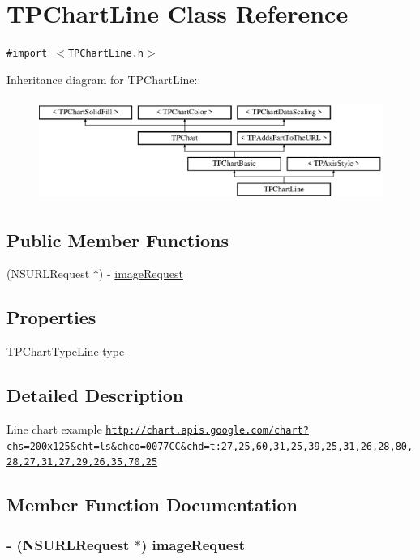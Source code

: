 \hypertarget{interface_t_p_chart_line}{
\section{TPChartLine Class Reference}
\label{interface_t_p_chart_line}
}
{\tt \#import $<$TPChartLine.h$>$}

Inheritance diagram for TPChartLine::\begin{figure}[H]
\begin{center}
\leavevmode
\includegraphics[height=3.31361cm]{interface_t_p_chart_line}
\end{center}
\end{figure}
\subsection*{Public Member Functions}
\begin{CompactItemize}
\item 
(NSURLRequest $\ast$) - \hyperlink{interface_t_p_chart_line_2fa4ce27ed67bce0c2d0d2a9b41c026c}{imageRequest}
\end{CompactItemize}
\subsection*{Properties}
\begin{CompactItemize}
\item 
TPChartTypeLine \hyperlink{interface_t_p_chart_line_04e85b606d425d8329ea5f9b0ec0f50f}{type}
\end{CompactItemize}


\subsection{Detailed Description}
Line chart example \href{http://chart.apis.google.com/chart?chs=200x125&cht=ls&chco=0077CC&chd=t:27,25,60,31,25,39,25,31,26,28,80,28,27,31,27,29,26,35,70,25}{\tt http://chart.apis.google.com/chart?chs=200x125\&cht=ls\&chco=0077CC\&chd=t:27,25,60,31,25,39,25,31,26,28,80,28,27,31,27,29,26,35,70,25} 

\subsection{Member Function Documentation}
\hypertarget{interface_t_p_chart_line_2fa4ce27ed67bce0c2d0d2a9b41c026c}{
\subsubsection[{imageRequest}]{\setlength{\rightskip}{0pt plus 5cm}- (NSURLRequest $\ast$) imageRequest }}
\label{interface_t_p_chart_line_2fa4ce27ed67bce0c2d0d2a9b41c026c}


